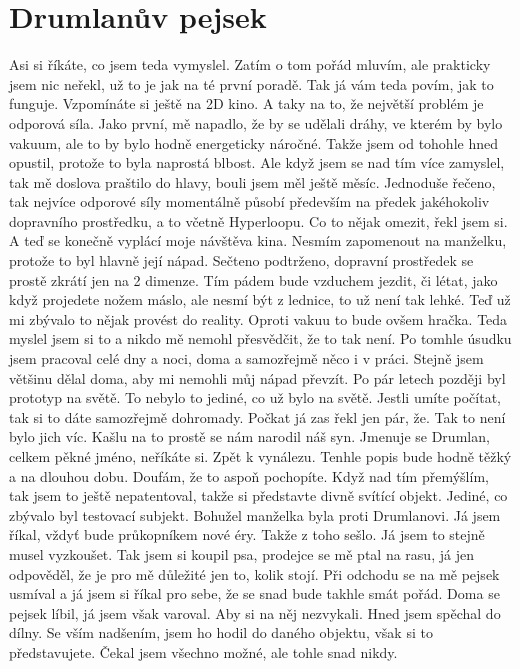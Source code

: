 \section{Drumlanův pejsek}

Asi si říkáte, co jsem teda vymyslel. Zatím o tom pořád mluvím, ale prakticky jsem nic neřekl, už to je jak na té první poradě. Tak já vám teda povím, jak to funguje. Vzpomínáte si ještě na 2D kino. A taky na to, že největší problém je odporová síla. Jako první, mě napadlo, že by se udělali dráhy, ve kterém by bylo vakuum, ale to by bylo hodně energeticky náročné. Takže jsem od tohohle hned opustil, protože to byla naprostá blbost. Ale když jsem se nad tím více zamyslel, tak mě doslova praštilo do hlavy, bouli jsem měl ještě měsíc. Jednoduše řečeno, tak nejvíce odporové síly momentálně působí především na předek jakéhokoliv dopravního prostředku, a to včetně Hyperloopu. Co to nějak omezit, řekl jsem si. A teď se konečně vyplácí moje návštěva kina. Nesmím zapomenout na manželku, protože to byl hlavně její nápad. Sečteno podtrženo, dopravní prostředek se prostě zkrátí jen na 2 dimenze. Tím pádem bude vzduchem jezdit, či létat, jako když projedete nožem máslo, ale nesmí být z lednice, to už není tak lehké. Teď už mi zbývalo to nějak provést do reality. Oproti vakuu to bude ovšem hračka. Teda myslel jsem si to a nikdo mě nemohl přesvědčit, že to tak není. Po tomhle úsudku jsem pracoval celé dny a noci, doma a samozřejmě něco i v práci. Stejně jsem většinu dělal doma, aby mi nemohli můj nápad převzít. Po pár letech později byl prototyp na světě. To nebylo to jediné, co už bylo na světě. Jestli umíte počítat, tak si to dáte samozřejmě dohromady. Počkat já zas řekl jen pár, že. Tak to není bylo jich víc. Kašlu na to prostě se nám narodil náš syn. Jmenuje se Drumlan, celkem pěkné jméno, neříkáte si. Zpět k vynálezu. Tenhle popis bude hodně těžký a na dlouhou dobu. Doufám, že to aspoň pochopíte. Když nad tím přemýšlím, tak jsem to ještě nepatentoval, takže si představte divně svítící objekt. Jediné, co zbývalo byl testovací subjekt. Bohužel manželka byla proti Drumlanovi. Já jsem říkal, vždyť bude průkopníkem nové éry. Takže z toho sešlo. Já jsem to stejně musel vyzkoušet. Tak jsem si koupil psa, prodejce se mě ptal na rasu, já jen odpověděl, že je pro mě důležité jen to, kolik stojí. Při odchodu se na mě pejsek usmíval a já jsem si říkal pro sebe, že se snad bude takhle smát pořád. Doma se pejsek líbil, já jsem však varoval. Aby si na něj nezvykali. Hned jsem spěchal do dílny. Se vším nadšením, jsem ho hodil do daného objektu, však si to představujete. Čekal jsem všechno možné, ale tohle snad nikdy.

